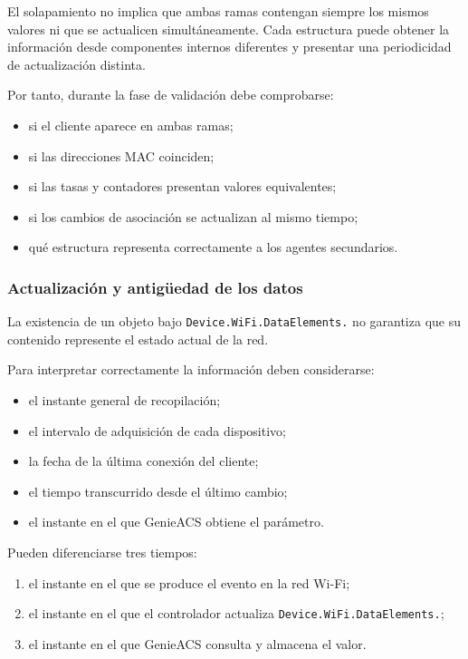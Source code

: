 El solapamiento no implica que ambas ramas contengan siempre los mismos
valores ni que se actualicen simultáneamente. Cada estructura puede
obtener la información desde componentes internos diferentes y presentar
una periodicidad de actualización distinta.

Por tanto, durante la fase de validación debe comprobarse:

\begin{itemize}
    \item si el cliente aparece en ambas ramas;
    \item si las direcciones MAC coinciden;
    \item si las tasas y contadores presentan valores equivalentes;
    \item si los cambios de asociación se actualizan al mismo tiempo;
    \item qué estructura representa correctamente a los agentes
    secundarios.
\end{itemize}


\subsubsection*{Actualización y antigüedad de los datos}

La existencia de un objeto bajo
\texttt{Device.WiFi.DataElements.} no garantiza que su contenido
represente el estado actual de la red.

Para interpretar correctamente la información deben considerarse:

\begin{itemize}
    \item el instante general de recopilación;
    \item el intervalo de adquisición de cada dispositivo;
    \item la fecha de la última conexión del cliente;
    \item el tiempo transcurrido desde el último cambio;
    \item el instante en el que GenieACS obtiene el parámetro.
\end{itemize}

Pueden diferenciarse tres tiempos:

\begin{enumerate}
    \item el instante en el que se produce el evento en la red Wi-Fi;

    \item el instante en el que el controlador actualiza
    \texttt{Device.WiFi.DataElements.};

    \item el instante en el que GenieACS consulta y almacena el valor.
\end{enumerate}


